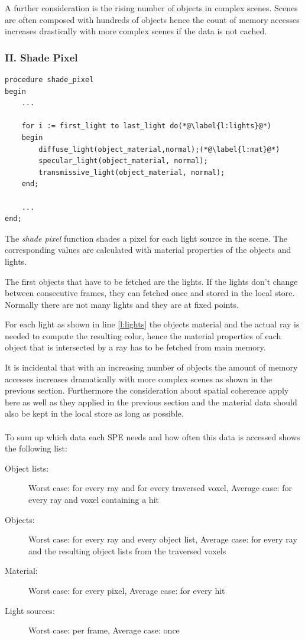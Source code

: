 \documentclass[DIV10, abstracton, openright, footsepline, headsepline, twoside, 9pt,
bigheadings]{scrreprt}
\begin{document}
A further consideration is the rising number of objects in complex scenes. Scenes are
often composed with hundreds of objects hence the count of memory  accesses increases
drastically with more complex scenes if the data is not cached.\\
\subsubsection*{II. Shade Pixel}
\begin{lstlisting}[caption=Pseudo code for "shade pixel"
function]
procedure shade_pixel
begin
	...

	for i := first_light to last_light do(*@\label{l:lights}@*)
	begin
		diffuse_light(object_material,normal);(*@\label{l:mat}@*)
		specular_light(object_material, normal);
		transmissive_light(object_material, normal);
	end;

	...
end;
\end{lstlisting}

The \textit{shade pixel} function shades a pixel for each light source in the
scene. The corresponding values are calculated with material properties of the
objects and lights.

The first objects that have to be fetched are the lights. If the lights don't
change between consecutive frames, they can fetched once and stored in the
local store. Normally there are not many lights and they are at fixed points.

For each light as shown in line \ref{l:lights} the objects material and the
actual ray is needed to compute the resulting color, hence the material
properties of each object that is intersected by a ray has to be fetched
 from main memory.

It is incidental that with an increasing number of objects the
amount of memory accesses increases dramatically with more complex scenes as
shown in the previous section. Furthermore the consideration about
spatial coherence apply here as well as they applied in the previous section and
the material data should also be kept in the local store as long as
possible.\\\\
To sum up which data each SPE needs and how often this data is accessed shows
the following list:
\begin{description}
\item[Object lists:] Worst case: for every ray and for every traversed voxel,
Average case: for every ray and voxel containing a hit
\item[Objects:] Worst case: for every ray and every object list, Average case:
for every ray and the resulting object lists from the traversed voxels
\item[Material:] Worst case: for every pixel, Average case: for every hit
\item[Light sources:] Worst case: per frame, Average case: once
\end{description}
\end{document}
